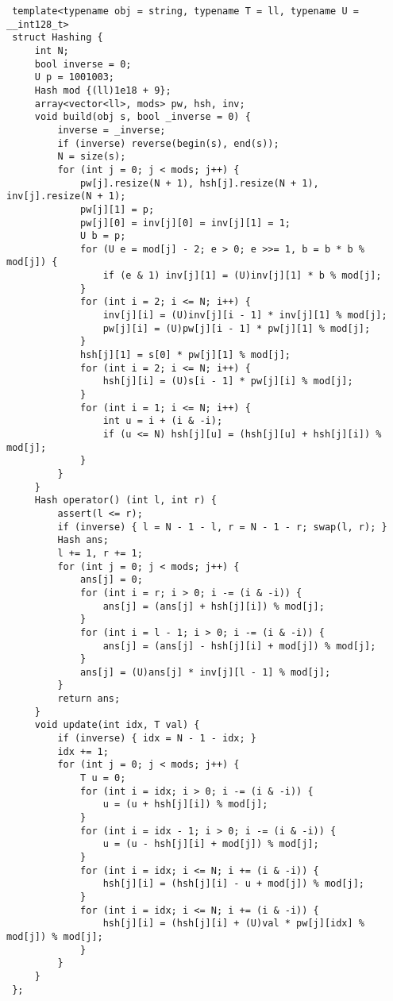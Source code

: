 \documentclass[11pt, a4paper, twoside]{article}
\begin{document}
\begin{lstlisting}
 template<typename obj = string, typename T = ll, typename U = __int128_t> 
 struct Hashing {
     int N;
     bool inverse = 0;
     U p = 1001003;
     Hash mod {(ll)1e18 + 9};
     array<vector<ll>, mods> pw, hsh, inv;
     void build(obj s, bool _inverse = 0) {
         inverse = _inverse;
         if (inverse) reverse(begin(s), end(s));
         N = size(s);
         for (int j = 0; j < mods; j++) {
             pw[j].resize(N + 1), hsh[j].resize(N + 1), inv[j].resize(N + 1);
             pw[j][1] = p;
             pw[j][0] = inv[j][0] = inv[j][1] = 1;
             U b = p;
             for (U e = mod[j] - 2; e > 0; e >>= 1, b = b * b % mod[j]) {
                 if (e & 1) inv[j][1] = (U)inv[j][1] * b % mod[j];
             }
             for (int i = 2; i <= N; i++) {
                 inv[j][i] = (U)inv[j][i - 1] * inv[j][1] % mod[j];
                 pw[j][i] = (U)pw[j][i - 1] * pw[j][1] % mod[j];
             }
             hsh[j][1] = s[0] * pw[j][1] % mod[j];
             for (int i = 2; i <= N; i++) {
                 hsh[j][i] = (U)s[i - 1] * pw[j][i] % mod[j];
             }
             for (int i = 1; i <= N; i++) {
                 int u = i + (i & -i);
                 if (u <= N) hsh[j][u] = (hsh[j][u] + hsh[j][i]) % mod[j];
             }
         }
     }
     Hash operator() (int l, int r) {
         assert(l <= r);
         if (inverse) { l = N - 1 - l, r = N - 1 - r; swap(l, r); }
         Hash ans;
         l += 1, r += 1;
         for (int j = 0; j < mods; j++) {
             ans[j] = 0;
             for (int i = r; i > 0; i -= (i & -i)) {
                 ans[j] = (ans[j] + hsh[j][i]) % mod[j];
             }
             for (int i = l - 1; i > 0; i -= (i & -i)) {
                 ans[j] = (ans[j] - hsh[j][i] + mod[j]) % mod[j];
             }
             ans[j] = (U)ans[j] * inv[j][l - 1] % mod[j];
         }
         return ans;
     }
     void update(int idx, T val) {
         if (inverse) { idx = N - 1 - idx; }
         idx += 1;
         for (int j = 0; j < mods; j++) {
             T u = 0;
             for (int i = idx; i > 0; i -= (i & -i)) {
                 u = (u + hsh[j][i]) % mod[j];
             }
             for (int i = idx - 1; i > 0; i -= (i & -i)) {
                 u = (u - hsh[j][i] + mod[j]) % mod[j];
             } 
             for (int i = idx; i <= N; i += (i & -i)) {
                 hsh[j][i] = (hsh[j][i] - u + mod[j]) % mod[j];
             }
             for (int i = idx; i <= N; i += (i & -i)) {
                 hsh[j][i] = (hsh[j][i] + (U)val * pw[j][idx] % mod[j]) % mod[j];
             }
         }
     }
 };
\end{lstlisting}
\end{document}
